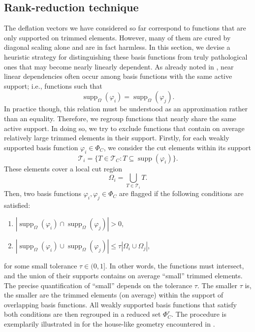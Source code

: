 \documentclass{article}
\numberwithin{equation}{section}
\DeclareMathOperator{\supp}{\operatorname{supp}}
\theoremstyle{definition}
\begin{document}
\subsection{Rank-reduction technique}
The deflation vectors we have considered so far correspond to functions that are only supported on trimmed elements. However, many of them are cured by diagonal scaling alone and are in fact harmless. In this section, we devise a heuristic strategy for distinguishing these basis functions from truly pathological ones that may become nearly linearly dependent. As already noted in \cite{de2017condition}, near linear dependencies often occur among basis functions with the same active support; i.e., functions such that
\begin{equation*}
    \supp_{\Omega}(\varphi_i) = \supp_{\Omega}(\varphi_j).
\end{equation*}
In practice though, this relation must be understood as an approximation rather than an equality. Therefore, we regroup functions that nearly share the same active support. In doing so, we try to exclude functions that contain on average relatively large trimmed elements in their support. Firstly, for each weakly supported basis function $\varphi_i \in \Phi_C$, we consider the cut elements within its support
\begin{equation*}
    \mathcal{T}_{i} = \{T \in \mathcal{T}_C \colon T \subseteq \supp(\varphi_i)\}.
\end{equation*}
These elements cover a local cut region
\begin{equation*}
    \Omega_{i} = \bigcup_{T \in \mathcal{T}_{i}} T.
\end{equation*}
Then, two basis functions $\varphi_i, \varphi_j \in \Phi_C$ are flagged if the following conditions are satisfied:
\begin{enumerate}
    \item $|\supp_{\Omega}(\varphi_i) \cap \supp_{\Omega}(\varphi_j)| > 0$,
    \item $|\supp_{\Omega}(\varphi_i) \cup \supp_{\Omega}(\varphi_j)| \leq \tau |\Omega_i \cup \Omega_j|$,
\end{enumerate}
for some small tolerance $\tau \in (0,1]$. In other words, the functions must intersect, and the union of their supports contains on average ``small'' trimmed elements. The precise quantification of ``small'' depends on the tolerance $\tau$. The smaller $\tau$ is, the smaller are the trimmed elements (on average) within the support of overlapping basis functions. All weakly supported basis functions that satisfy both conditions are then regrouped in a reduced set $\Phi_C^r$. The procedure is exemplarily illustrated in  for the house-like geometry encountered in .
\end{document}
